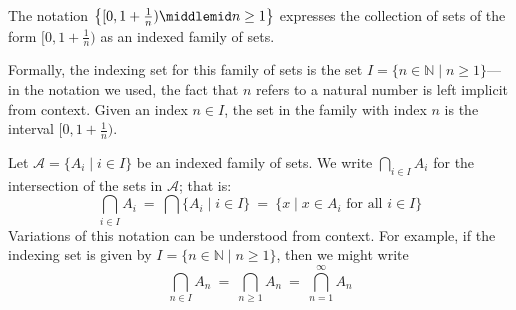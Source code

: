 \begin{example}
\label{exIndexedFamilyOfHalfOpenIntervals}
The notation $\left\{ [0, 1+\frac{1}{n}) \middlemid n \ge 1 \right\}$ expresses the collection of sets of the form $[0,1+\frac{1}{n})$ as an indexed family of sets.

Formally, the indexing set for this family of sets is the set $I = \{ n \in \mathbb{N} \mid n \ge 1 \}$---in the notation we used, the fact that $n$ refers to a natural number is left implicit from context. Given an index $n \in I$, the set in the family with index $n$ is the interval $[0,1+\frac{1}{n})$.
\end{example}

\begin{notation}
\label{ntnIntersectionIndexed}
Let $\mathcal{A} = \{ A_i \mid i \in I \}$ be an indexed family of sets. We write $\displaystyle \bigcap_{i \in I} A_i$ for the intersection of the sets in $\mathcal{A}$; that is:
\[ \bigcap_{i \in I} A_i ~=~ \bigcap \{ A_i \mid i \in I \} ~=~ \{ x \mid x \in A_i \text{ for all } i \in I \} \]
Variations of this notation can be understood from context. For example, if the indexing set is given by $I = \{ n \in \mathbb{N} \mid n \ge 1 \}$, then we might write
\[ \bigcap_{n \in I} A_n ~=~ \bigcap_{n \ge 1} A_n ~=~ \bigcap_{n=1}^{\infty} A_n \]
\end{notation}

